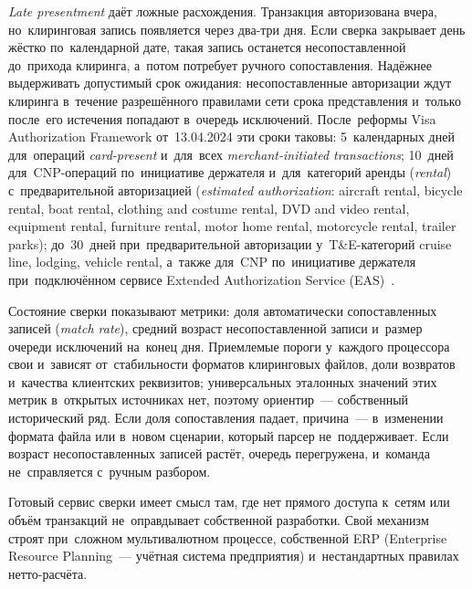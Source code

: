 
\textit{Late presentment} даёт ложные расхождения. Транзакция авторизована
вчера, но~клиринговая запись появляется через два-три дня. Если сверка закрывает
день жёстко по~календарной дате, такая запись останется несопоставленной
до~прихода клиринга, а~потом потребует ручного сопоставления. Надёжнее
выдерживать допустимый срок ожидания: несопоставленные авторизации ждут клиринга
в~течение разрешённого правилами сети срока представления и~только после~его
истечения попадают в~очередь исключений. После~реформы Visa Authorization
Framework от~13.04.2024 эти сроки таковы: 5~календарных дней для~операций
\textit{card-present} и~для~всех \textit{merchant-initiated transactions};
10~дней для~CNP-операций по~инициативе держателя и~для~категорий аренды
(\textit{rental}) с~предварительной авторизацией (\textit{estimated authorization}:
  aircraft rental, bicycle rental, boat rental, clothing and costume rental,
  DVD and video rental, equipment rental, furniture rental, motor home rental,
motorcycle rental, trailer parks);
до~30~дней при~предварительной авторизации у~T\&E-категорий cruise line, lodging,
vehicle rental, а~также для~CNP по~инициативе держателя при~подключённом сервисе
Extended Authorization Service (EAS)~\cite{visa-core-rules}.

Состояние сверки показывают метрики: доля автоматически сопоставленных
записей (\textit{match rate}), средний возраст несопоставленной записи и~размер очереди
исключений на~конец дня. Приемлемые пороги у~каждого процессора свои и~зависят
от~стабильности форматов клиринговых файлов, доли возвратов и~качества
клиентских реквизитов; универсальных эталонных значений этих метрик
в~открытых источниках нет, поэтому ориентир~--- собственный исторический ряд.
Если доля сопоставления падает, причина~--- в~изменении формата файла или в~новом
сценарии, который парсер не~поддерживает. Если возраст несопоставленных записей
растёт, очередь перегружена, и~команда не~справляется с~ручным разбором.

Готовый сервис сверки имеет смысл там, где нет прямого доступа к~сетям или
объём транзакций не~оправдывает собственной разработки. Свой механизм строят
при~сложном мультивалютном процессе, собственной ERP (Enterprise Resource
Planning~--- учётная система предприятия) и~нестандартных правилах
нетто-расчёта.


